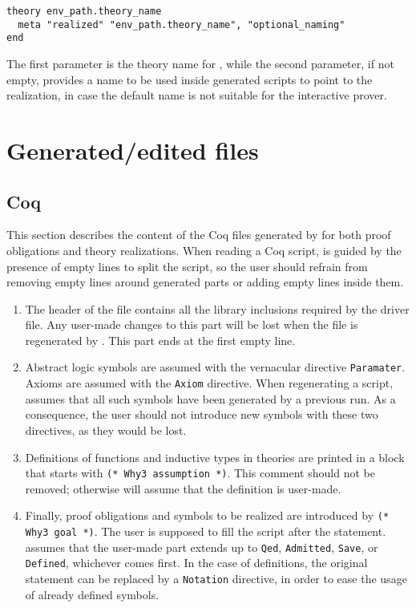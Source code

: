 \begin{verbatim}
theory env_path.theory_name
  meta "realized" "env_path.theory_name", "optional_naming"
end
\end{verbatim}

The first parameter is the theory name for \why, while the second
parameter, if not empty, provides a name to be used inside generated
scripts to point to the realization, in case the default name is not
suitable for the interactive prover.

\section{Generated/edited files}

\subsection{Coq}

This section describes the content of the Coq files generated by \why for
both proof obligations and theory realizations. When reading a Coq
script, \why is guided by the presence of empty lines to split the
script, so the user should refrain from removing empty lines around
generated parts or adding empty lines inside them.

\begin{enumerate}
\item	The header of the file contains all the library inclusions
	required by the driver file. Any user-made changes to this part
	will be lost when the file is regenerated by \why. This part ends
	at the first empty line.
\item	Abstract logic symbols are assumed with the vernacular directive
	\verb+Paramater+. Axioms are assumed with the \verb+Axiom+
	directive. When regenerating a script, \why assumes that all such
	symbols have been generated by a previous run. As a consequence,
	the user should not introduce new symbols with these two
	directives, as they would be lost.
\item	Definitions of functions and inductive types in theories are
	printed in a block that starts with \verb+(* Why3 assumption *)+.
	This comment should not be removed; otherwise \why will assume
	that the definition is user-made.
\item	Finally, proof obligations and symbols to be realized are
	introduced by \verb+(* Why3 goal *)+. The user is supposed to
	fill the script after the statement. \why assumes that the
	user-made part extends up to \verb+Qed+, \verb+Admitted+,
	\verb+Save+, or \verb+Defined+, whichever comes first. In the
	case of definitions, the original statement can be replaced by
	a \verb+Notation+ directive, in order to ease the usage of
	already defined symbols.
\end{enumerate}

